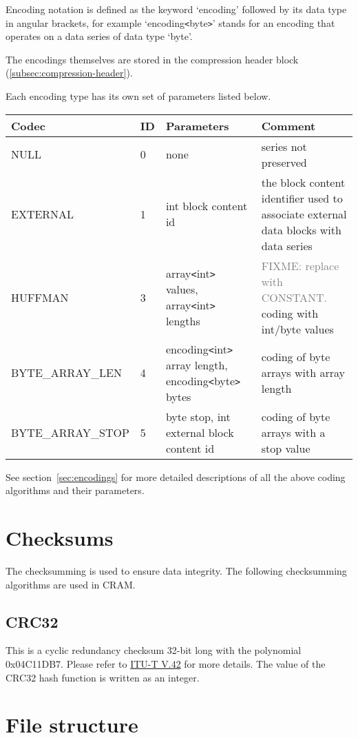 \documentclass[a4paper]{article}
\begin{document}
Encoding notation is defined as the keyword `encoding' followed by its data type 
in angular brackets, for example `encoding\texttt{<}byte\texttt{>}' stands for 
an encoding that operates on a data series of data type `byte'.

The encodings themselves are stored in the compression header block
(\ref{subsec:compression-header}).

Each encoding type has its own set of parameters listed below.

\begin{tabular}{|l|l|>{\raggedright}p{155pt}|>{\raggedright}p{160pt}|}
\hline
\textbf{Codec} & \textbf{ID} & \textbf{Parameters} & \textbf{Comment}\tabularnewline
\hline
NULL & 0 & none & series not preserved\tabularnewline
\hline
EXTERNAL & 1 & int block content id & the block content identifier used to associate 
external data blocks with data series\tabularnewline
\hline
HUFFMAN & 3 & array\texttt{<}int\texttt{>} values, array\texttt{<}int\texttt{>} lengths & \textcolor{gray}{FIXME: replace with CONSTANT.} coding with int/byte values\tabularnewline
\hline
BYTE\_ARRAY\_LEN & 4 & encoding\texttt{<}int\texttt{>} array length, encoding\texttt{<}byte\texttt{>} 
bytes & coding of byte arrays with array length\tabularnewline
\hline
BYTE\_ARRAY\_STOP & 5 & byte stop, int external block\linebreak{}
content id & coding of byte arrays with a stop value \tabularnewline
\hline
\end{tabular}

See section~\ref{sec:encodings} for more detailed descriptions of all the above coding algorithms and their parameters.

\section{\textbf{Checksums}}
The checksumming is used to ensure data integrity. The following checksumming algorithms are used in CRAM.
\subsection{\textbf{CRC32}}
This is a cyclic redundancy checksum 32-bit long with the polynomial 0x04C11DB7. Please refer to \href{http://www.itu.int/rec/recommendation.asp?type=folders&lang=e&parent=T-REC-V.42}{ITU-T V.42} for more details. The value of the CRC32 hash function is written as an integer.

\section{\textbf{File structure}}
\end{document}
